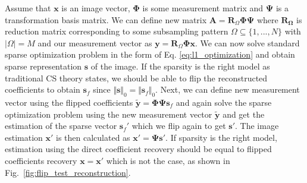 \documentclass[journal]{IEEEtran}
\begin{document}
Assume that $\boldsymbol{x}$ is an image vector, $\boldsymbol{\Phi}$ is some measurement matrix and $\boldsymbol{\Psi}$ is a transformation basis matrix. We can define new matrix $\boldsymbol{A}=\boldsymbol{R}_\Omega \boldsymbol{\Phi}\boldsymbol{\Psi}$ where $\boldsymbol{R_\Omega}$ is reduction matrix corresponding to some subsampling pattern $\Omega \subseteq \{1,...,N\}$ with $\vert \Omega\vert = M$ and our measurement vector as $\boldsymbol{y}=\boldsymbol{R}_\Omega\boldsymbol{\Phi}\boldsymbol{x}$. We can now solve standard sparse optimization problem in the form of Eq. \ref{eq:l1_optimization} and obtain sparse representation $\boldsymbol{s}$ of the image. If the sparsity is the right model as traditional CS theory states, we should be able to flip the reconstructed coefficients to obtain $\boldsymbol{s}_f$ since $\Vert\boldsymbol{s}\Vert_0=\Vert\boldsymbol{s}_f\Vert_0$. Next, we can define new measurement vector using the flipped coefficients $\boldsymbol{\tilde{y}}=\boldsymbol{\Phi}\boldsymbol{\Psi}\boldsymbol{s}_f$ and again solve the sparse optimization problem using the new measurement vector $\boldsymbol{\tilde{y}}$ and get the estimation of the sparse vector $\boldsymbol{s}_{f}'$ which we flip again to get $\boldsymbol{{s'}}$. The image estimation $\boldsymbol{{x'}}$ is then calculated as $\boldsymbol{{x}'}=\boldsymbol{\Psi}\boldsymbol{{s'}}$. If sparsity is the right model, estimation using the direct coefficient recovery should be equal to flipped coefficients recovery $\boldsymbol{{x}=\boldsymbol{x'}}$ which is not the case, as shown in Fig.~\ref{fig:flip_test_reconstruction}. 
\end{document}
